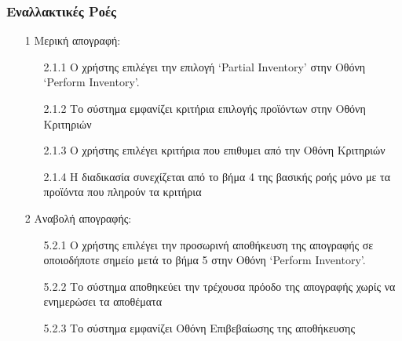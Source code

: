 \documentclass[12pt,a4paper,twoside]{book}
\begin{document}
\subsubsection{Εναλλακτικές Ροές}
\begin{enumerate}
  \item[1 ] Μερική απογραφή:
        \begin{enumerate}
          \item[2.1.1 ] Ο χρήστης επιλέγει την επιλογή `Partial Inventory' στην Οθόνη `Perform Inventory'. %
          \item[2.1.2 ] Το σύστημα εμφανίζει κριτήρια επιλογής προϊόντων στην Οθόνη Κριτηριών
          \item[2.1.3 ] Ο χρήστης επιλέγει κριτήρια που επιθυμει από την Οθόνη Κριτηριών %
          \item[2.1.4 ] Η διαδικασία συνεχίζεται από το βήμα 4 της βασικής ροής μόνο με τα προϊόντα που πληρούν τα κριτήρια %
        \end{enumerate}
  \item[2 ] Αναβολή απογραφής:
        \begin{enumerate}
          \item[5.2.1 ] Ο χρήστης επιλέγει την προσωρινή αποθήκευση της απογραφής σε οποιοδήποτε σημείο μετά το βήμα 5 στην Οθόνη `Perform Inventory'. %
          \item[5.2.2 ] Το σύστημα αποθηκεύει την τρέχουσα πρόοδο της απογραφής χωρίς να ενημερώσει τα αποθέματα %
          \item[5.2.3 ] Το σύστημα εμφανίζει Οθόνη Επιβεβαίωσης της αποθήκευσης %

\end{enumerate}
\end{enumerate}
\end{document}
